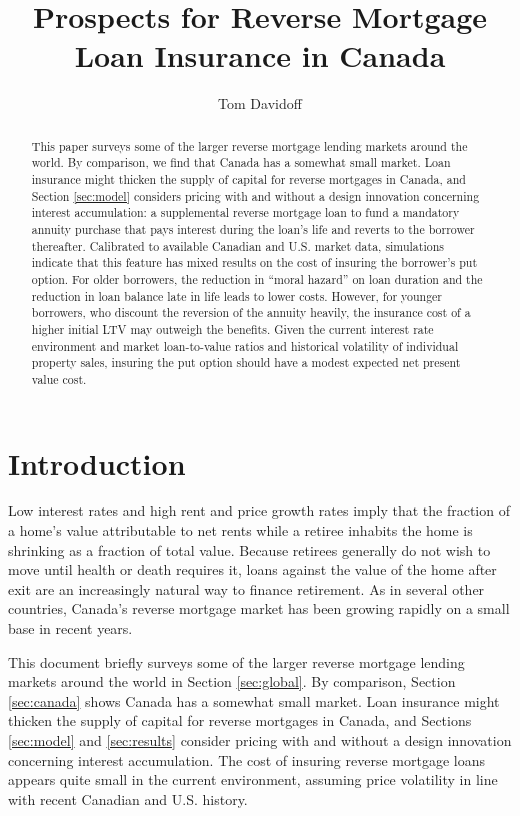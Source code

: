 \documentclass[12pt]{article}
\begin{document}
\title{Prospects for Reverse Mortgage Loan Insurance in Canada}
\author{Tom Davidoff}
\maketitle

\onehalfspacing

\begin{abstract}

	This paper surveys some of the larger reverse mortgage lending markets
	around the world. By comparison, we find that Canada has a somewhat
	small market. Loan insurance might thicken the supply of capital for
	reverse mortgages in Canada, and Section \ref{sec:model} considers
	pricing with and without a design innovation concerning interest
	accumulation: a supplemental reverse mortgage loan to fund a mandatory
	annuity purchase that pays interest during the loan's life and reverts
	to the borrower thereafter. Calibrated to available Canadian and U.S.
	market data, simulations indicate that this feature has mixed results
	on the cost of insuring the borrower's put option. For older borrowers,
	the reduction in ``moral hazard'' on loan duration and the reduction in
	loan balance late in life leads to lower costs. However, for younger
	borrowers, who discount the reversion of the annuity heavily, the
	insurance cost of a higher initial LTV may outweigh the benefits. Given
	the current interest rate environment and market loan-to-value ratios
	and historical volatility of individual property sales, insuring
	the put option should have a modest expected net present value cost.

\end{abstract}

\section{Introduction}

Low interest rates and high rent and price growth rates imply that the fraction
of a home's value attributable to net rents while a retiree inhabits the home
is shrinking as a fraction of total value. Because retirees generally do not
wish to move until health or death requires it, loans against the value of the
home after exit are an increasingly natural way to finance retirement. As in
several other countries, Canada's reverse mortgage market has been growing
rapidly on a small base in recent years. 

This document briefly surveys some of the larger reverse mortgage lending
markets around the world in Section \ref{sec:global}. By comparison, Section
\ref{sec:canada} shows Canada has a somewhat small market. Loan insurance might
thicken the supply of capital for reverse mortgages in Canada, and Sections
\ref{sec:model} and \ref{sec:results} consider pricing with and without a
design innovation concerning interest accumulation. The cost of insuring
reverse mortgage loans appears quite small in the current environment, assuming
price volatility in line with recent Canadian and U.S. history.
\end{document}
